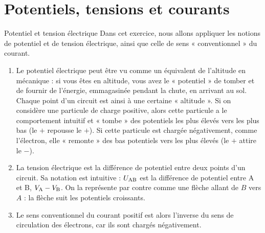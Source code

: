 \documentclass[10pt,a5paper,notitlepage]{book}
\begin{document}
\section{Potentiels, tensions et courants}

\begin{defi}{Potentiel et tension électrique}
	Dans cet exercice, nous allons appliquer les notions de potentiel et de
    tension électrique, ainsi que celle de sens « conventionnel » du courant.
	\begin{enumerate}
        \item Le potentiel électrique peut être vu comme un équivalent de
            l'altitude en mécanique : si vous êtes en altitude, vous avez le «
            potentiel » de tomber et de fournir de l'énergie, emmagasinée
            pendant la chute, en arrivant au sol. Chaque point d'un circuit est
            ainsi à une certaine « altitude ». Si on considère une particule de
            charge positive, alors cette particule a le comportement intuitif et
            « tombe » des potentiels les plus élevés vers les plus bas (le $+$
            repousse le $+$). Si cette particule est chargée négativement, comme
            l'électron, elle « remonte » des bas potentiels vers les plus élevés
            (le $+$ attire le $-$).
        \item La tension électrique est la différence de potentiel entre deux
            points d'un circuit. Sa notation est intuitive : $U_{\rm AB}$ est la
            différence de potentiel entre A et B, $V_{\rm A} - V_{\rm B}$. On la
            représente par contre comme une flèche allant de $B$ vers $A$ : la
            flèche suit les potentiels croissants.
        \item Le sens conventionnel du courant positif est alors l'inverse du
            sens de circulation des électrons, car ils sont chargés
            négativement.
	\end{enumerate}
\end{defi}
\end{document}
